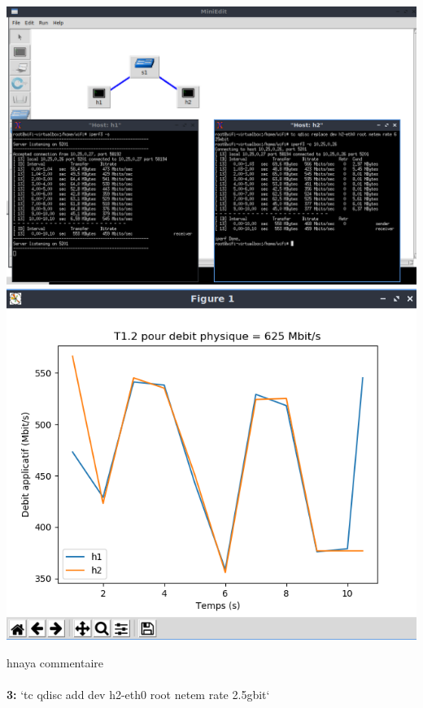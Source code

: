 \begin{center}
    \includegraphics[width=1\textwidth]{./images/T1.2/625test2.png}
    \includegraphics[width=1\textwidth]{./images/T1.2/courbe625test2.png}
\end{center}
hnaya commentaire\\
\\
\vspace{1cm}
\textbf{3:} `tc qdisc add dev h2-eth0 root netem rate 2.5gbit`
